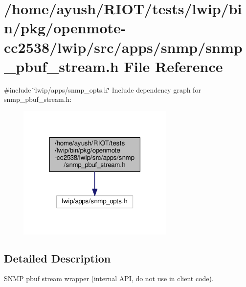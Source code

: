 \hypertarget{openmote-cc2538_2lwip_2src_2apps_2snmp_2snmp__pbuf__stream_8h}{}\section{/home/ayush/\+R\+I\+O\+T/tests/lwip/bin/pkg/openmote-\/cc2538/lwip/src/apps/snmp/snmp\+\_\+pbuf\+\_\+stream.h File Reference}
\label{openmote-cc2538_2lwip_2src_2apps_2snmp_2snmp__pbuf__stream_8h}
{\ttfamily \#include \char`\"{}lwip/apps/snmp\+\_\+opts.\+h\char`\"{}}\newline
Include dependency graph for snmp\+\_\+pbuf\+\_\+stream.\+h\+:
\nopagebreak
\begin{figure}[H]
\begin{center}
\leavevmode
\includegraphics[width=219pt]{openmote-cc2538_2lwip_2src_2apps_2snmp_2snmp__pbuf__stream_8h__incl}
\end{center}
\end{figure}


\subsection{Detailed Description}
S\+N\+MP pbuf stream wrapper (internal A\+PI, do not use in client code). 